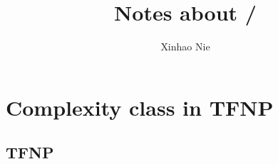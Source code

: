 \documentclass{article}
\begin{document}
\title{Notes about \tfnp/}
\author{Xinhao Nie}
\maketitle

\section{Complexity class in TFNP}
\subsection{TFNP}

\end{document}

